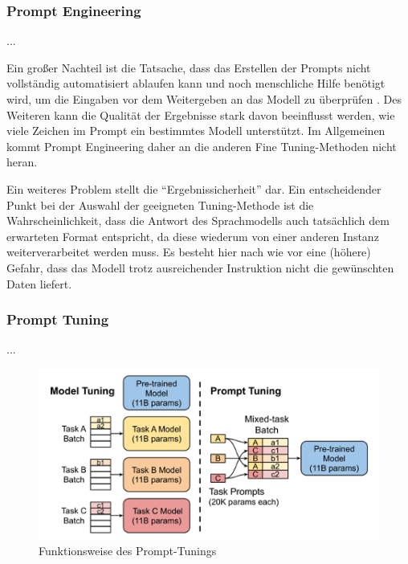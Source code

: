 \subsubsection{Prompt Engineering}\label{sec:prompt_engineering}

...

\smallskip\par\noindent
Ein großer Nachteil ist die Tatsache, dass das Erstellen der Prompts nicht vollständig automatisiert ablaufen kann und noch menschliche Hilfe benötigt wird, um die Eingaben vor dem Weitergeben an das Modell zu überprüfen \cite[1]{Lester2021}. Des Weiteren kann die Qualität der Ergebnisse stark davon beeinflusst werden, wie viele Zeichen im Prompt ein bestimmtes Modell unterstützt. Im Allgemeinen kommt Prompt Engineering daher an die anderen Fine Tuning-Methoden nicht heran.

\smallskip\par\noindent
Ein weiteres Problem stellt die \enquote{Ergebnissicherheit} dar. Ein entscheidender Punkt bei der Auswahl der geeigneten Tuning-Methode ist die Wahrscheinlichkeit, dass die Antwort des Sprachmodells auch tatsächlich dem erwarteten Format entspricht, da diese wiederum von einer anderen Instanz weiterverarbeitet werden muss. Es besteht hier nach wie vor eine (höhere) Gefahr, dass das Modell trotz ausreichender Instruktion nicht die gewünschten Daten liefert.

\subsubsection{Prompt Tuning}\label{sec:prompt_tuning}

...

\begin{figure}
    \centering
    \includegraphics[scale=0.6]{images/asuender/prompt_tuning.png}
    \caption{Funktionsweise des Prompt-Tunings \cite[2]{Lester2021}}
    \label{fig:prompt_tuning}
\end{figure}

